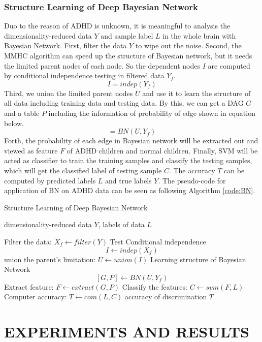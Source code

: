 \documentclass{article}
\begin{document}
\subsubsection{Structure Learning of Deep Bayesian Network}
Duo to the reason of ADHD is unknown, it is meaningful to analysis the
dimensionality-reduced data $Y$ and sample label $L$ in the
whole brain with Bayesian Network. First, filter the data $Y$ to wipe out the noise. Second, the MMHC algorithm can speed up the structure of Bayesian network, but it needs the limited parent nodes of each node. So the dependent nodes $I$ are computed by conditional independence testing in filtered data $Y_f$.
\begin{equation}
I = indep(Y_f)
\end{equation}
Third, we union the limited parent nodes $U$ and use it to learn the structure of all data including training data and testing data. By this, we can get a DAG $G$ and a table $P$ including the information of probability of edge shown in equation below.
\begin{equation}
[G,P] = BN(U,Y_f)
\end{equation}
Forth, the probability of each edge in Bayesian network will be extracted out and viewed as feature $F$ of ADHD children and normal children. Finally, SVM will be acted as classifier to train the training samples and classify the testing samples, which will get the classified label of testing sample $C$. The accuracy $T$ can be computed by predicted labels $L$ and true labels $Y$. The pseudo-code for application of BN on ADHD data can be seen as following Algorithm \ref{code:BN}.  
\begin{algorithm}[h]
\caption{Structure Learning of Deep Bayesian Network}
\label{code:BN}
\begin{algorithmic}[1]
\Require
dimensionality-reduced data $Y$, labels of data $L$

\State Filter the data: $X_{f} \gets filter(Y)$ 
\State Test Conditional independence
\[
I \gets indep(X_{f})
\] 
\State union the parent's limitation: $U \gets union(I)$
\State Learning structure of Bayesian Network
\[ [G,P] \gets BN(U,Y_f)
\]
\State Extract feature: $F \gets extract(G,P)$
\State Classify the features: $C \gets svm(F,L)$ 
\State Computer accuracy: $T \gets com(L,C)$ 
\Ensure
accuracy of discrimination $T$
\end{algorithmic}
\end{algorithm}



\section{EXPERIMENTS AND RESULTS}
\end{document}
